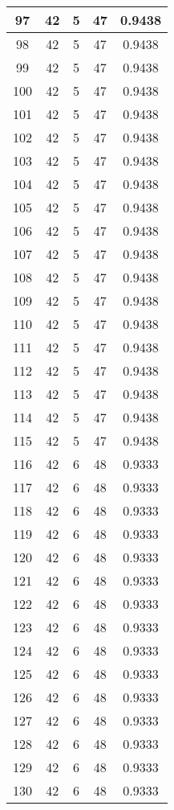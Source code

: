 \documentclass[letterpaper, 12pt]{article}
\begin{document}
\begin{longtable}{|c|c|c|c|c|}
\hline
97 & 42 & 5 & 47 & 0.9438 \\
\hline
98 & 42 & 5 & 47 & 0.9438 \\
\hline
99 & 42 & 5 & 47 & 0.9438 \\
\hline
100 & 42 & 5 & 47 & 0.9438 \\
\hline
101 & 42 & 5 & 47 & 0.9438 \\
\hline
102 & 42 & 5 & 47 & 0.9438 \\
\hline
103 & 42 & 5 & 47 & 0.9438 \\
\hline
104 & 42 & 5 & 47 & 0.9438 \\
\hline
105 & 42 & 5 & 47 & 0.9438 \\
\hline
106 & 42 & 5 & 47 & 0.9438 \\
\hline
107 & 42 & 5 & 47 & 0.9438 \\
\hline
108 & 42 & 5 & 47 & 0.9438 \\
\hline
109 & 42 & 5 & 47 & 0.9438 \\
\hline
110 & 42 & 5 & 47 & 0.9438 \\
\hline
111 & 42 & 5 & 47 & 0.9438 \\
\hline
112 & 42 & 5 & 47 & 0.9438 \\
\hline
113 & 42 & 5 & 47 & 0.9438 \\
\hline
114 & 42 & 5 & 47 & 0.9438 \\
\hline
115 & 42 & 5 & 47 & 0.9438 \\
\hline
116 & 42 & 6 & 48 & 0.9333 \\
\hline
117 & 42 & 6 & 48 & 0.9333 \\
\hline
118 & 42 & 6 & 48 & 0.9333 \\
\hline
119 & 42 & 6 & 48 & 0.9333 \\
\hline
120 & 42 & 6 & 48 & 0.9333 \\
\hline
121 & 42 & 6 & 48 & 0.9333 \\
\hline
122 & 42 & 6 & 48 & 0.9333 \\
\hline
123 & 42 & 6 & 48 & 0.9333 \\
\hline
124 & 42 & 6 & 48 & 0.9333 \\
\hline
125 & 42 & 6 & 48 & 0.9333 \\
\hline
126 & 42 & 6 & 48 & 0.9333 \\
\hline
127 & 42 & 6 & 48 & 0.9333 \\
\hline
128 & 42 & 6 & 48 & 0.9333 \\
\hline
129 & 42 & 6 & 48 & 0.9333 \\
\hline
130 & 42 & 6 & 48 & 0.9333 \\

\end{longtable}
\end{document}
